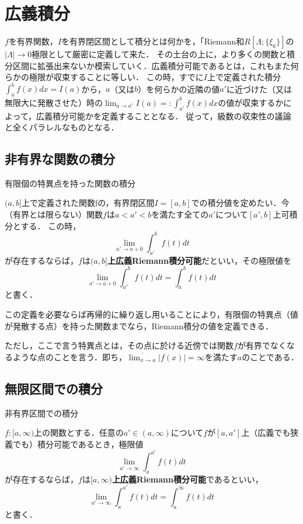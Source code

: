 \documentclass[uplatex, dvipdfmx]{jsreport}
\begin{document}
\section{広義積分}
$f$を有界関数，$I$を有界閉区間として積分とは何かを，「Riemann和$R[\Lambda;\{\xi_k\}]$の$|\Lambda|\to 0$極限として厳密に定義して来た．
その土台の上に，より多くの関数と積分区間に拡張出来ないか模索していく．広義積分可能であるとは，これもまた何らかの極限が収束することに等しい．
この時，すでに$I$上で定義された積分$\int^b_af(x)dx=I(a)$から，$a$（又は$b$）を何らかの近隣の値$a'$に近づけた（又は無限大に発散させた）時の$\lim_{a\to a'}I(a)=:\int^b_{a'}f(x)dx$の値が収束するかによって，広義積分可能かを定義することとなる．
従って，級数の収束性の議論と全くパラレルなものとなる．

\subsection{非有界な関数の積分}

\begin{itembox}[l]{有限個の特異点を持った関数の積分}
    \begin{definition}
        $(a,b]$上で定義された関数fの，有界閉区間$I=[a,b]$での積分値を定めたい．今（有界とは限らない）関数$f$は$a<a'<b$を満たす全ての$a'$について$[a',b]$上可積分とする．
        この時，$$\lim_{a'\to a+0}\int^b_{a'}f(t)dt$$が存在するならば，$f$は\textbf{$(a,b]$上広義Riemann積分可能}だといい，その極限値を$$\lim_{a'\to a+0}\int^b_{a'}f(t)dt = \int^b_af(t)dt$$と書く．
    \end{definition}
\end{itembox}

この定義を必要ならば再帰的に繰り返し用いることにより，有限個の特異点（値が発散する点）を持った関数までなら，Riemann積分の値を定義できる．

ただし，ここで言う特異点とは，その点に於ける近傍では関数$f$が有界でなくなるような点のことを言う．即ち，$\overline{\lim_{x\to a}}|f(x)|=\infty$を満たす$a$のことである．

\subsection{無限区間での積分}

\begin{itembox}[l]{非有界区間での積分}
    \begin{definition}
        $f:[a,\infty)$上の関数とする．任意の$a'\in (a,\infty)$について$f$が$[a,a']$上（広義でも狭義でも）積分可能であるとき，極限値$$\lim_{a'\to\infty}\int^{a'}_af(t)dt$$が存在するならば，$f$は\textbf{$[a,\infty)$上広義Riemann積分可能}であるといい，
        $$\lim_{a'\to\infty}\int^{a'}_af(t)dt = \int^\infty_af(t)dt$$と書く．
    \end{definition}
\end{itembox}
\end{document}
